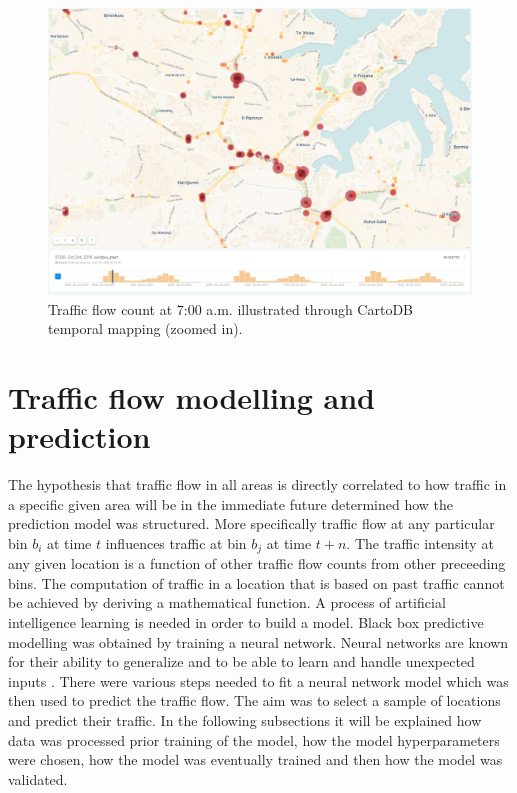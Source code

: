 \documentclass[12pt, a4paper]{report}
\theoremstyle{definition}
\theoremstyle{definition}%
\theoremstyle{definition}%
\theoremstyle{definition}%
\theoremstyle{definition}%
\theoremstyle{definition}%
\begin{document}
\begin{figure}[!]	
	\includegraphics[scale=0.4]{traffic_torque_700am_zoomin.jpg}
	\centering
	\caption{Traffic flow count at 7:00 a.m. illustrated through CartoDB temporal mapping (zoomed in). }
	\label{fig:traffic_torque_700am_zoomin}
\end{figure}

 



\section{Traffic flow modelling and prediction} \label{section:traffic_flow_modelling_and_prediction}


The hypothesis that traffic flow in all areas is directly correlated to how traffic in a specific given area will be in the immediate future determined how the prediction model was structured. More specifically traffic flow at any particular bin $b_i$ at time $t$ influences traffic at bin $b_j$ at time $t + n$. The traffic intensity at any given location is a function of other traffic flow counts from other preceeding bins. The computation of traffic in a location that is based on past traffic cannot be achieved by deriving a mathematical function. A process of artificial intelligence learning is needed in order to build a model. Black box predictive modelling was obtained by training a neural network. Neural networks are known for their ability to generalize and to be able to learn and handle unexpected inputs \cite{sommer2013using}. There were various steps needed to fit a neural network model which was then used to predict the traffic flow. The aim was to select a sample of locations and predict their traffic. In the following subsections it will be explained how data was processed prior training of the model, how the model hyperparameters were chosen, how the model was eventually trained and then how the model was validated.
\end{document}
